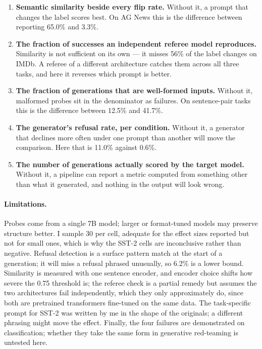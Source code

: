 \documentclass[11pt]{article}
\begin{document}
\begin{enumerate}
\item \textbf{Semantic similarity beside every flip rate.} Without it, a prompt
      that changes the label scores best. On AG News this is the difference
      between reporting 65.0\% and 3.3\%.
\item \textbf{The fraction of successes an independent referee model reproduces.}
      Similarity is not sufficient on its own --- it misses 56\% of the label
      changes on IMDb. A referee of a different architecture catches them across
      all three tasks, and here it reverses which prompt is better.
\item \textbf{The fraction of generations that are well-formed inputs.} Without
      it, malformed probes sit in the denominator as failures. On sentence-pair
      tasks this is the difference between 12.5\% and 41.7\%.
\item \textbf{The generator's refusal rate, per condition.} Without it, a
      generator that declines more often under one prompt than another will move
      the comparison. Here that is 11.0\% against 0.6\%.
\item \textbf{The number of generations actually scored by the target model.}
      Without it, a pipeline can report a metric computed from something other
      than what it generated, and nothing in the output will look wrong.
\end{enumerate}

\paragraph{Limitations.}
Probes come from a single 7B model; larger or format-tuned models may preserve
structure better. I sample 30 per cell, adequate for the effect sizes reported
but not for small ones, which is why the SST-2 cells are inconclusive rather than
negative. Refusal detection is a surface pattern match at the start of a
generation; it will miss a refusal phrased unusually, so 6.2\% is a lower bound.
Similarity is measured with one sentence encoder, and encoder choice shifts how
severe the 0.75 threshold is; the referee check is a partial remedy but assumes
the two architectures fail independently, which they only approximately do, since
both are pretrained transformers fine-tuned on the same data. The task-specific prompt for SST-2 was
written by me in the shape of the originals; a different phrasing might move the
effect. Finally, the four failures are demonstrated on classification; whether
they take the same form in generative red-teaming is untested here.
\end{document}
